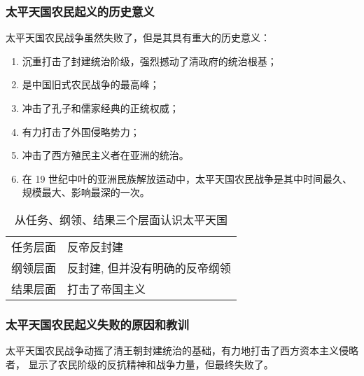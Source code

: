 \documentclass[utf-8, 10pt]{article}
\begin{document}
\subsubsection{太平天国农民起义的历史意义}

太平天国农民战争虽然失败了，但是其具有重大的历史意义：
\begin{enumerate}[label=(\arabic*), itemsep=0pt]
    \item 沉重打击了封建统治阶级，强烈撼动了清政府的统治根基；
    \item 是中国旧式农民战争的最高峰；
    \item 冲击了孔子和儒家经典的正统权威；
    \item 有力打击了外国侵略势力；
    \item 冲击了西方殖民主义者在亚洲的统治。
    \item 在 19 世纪中叶的亚洲民族解放运动中，太平天国农民战争是其中时间最久、
    规模最大、影响最深的一次。
\end{enumerate}

\begin{table}[H]
    \centering
    \caption{从任务、纲领、结果三个层面认识太平天国}
    \begin{tabular}{c|p{}}
        任务层面 & 反帝反封建 \\ 
        纲领层面 & 反封建, 但并没有明确的反帝纲领 \\ 
        结果层面 & 打击了帝国主义
    \end{tabular}
\end{table}

\subsubsection{太平天国农民起义失败的原因和教训}

太平天国农民战争动摇了清王朝封建统治的基础，有力地打击了西方资本主义侵略者，
显示了农民阶级的反抗精神和战争力量，但最终失败了。
\end{document}
